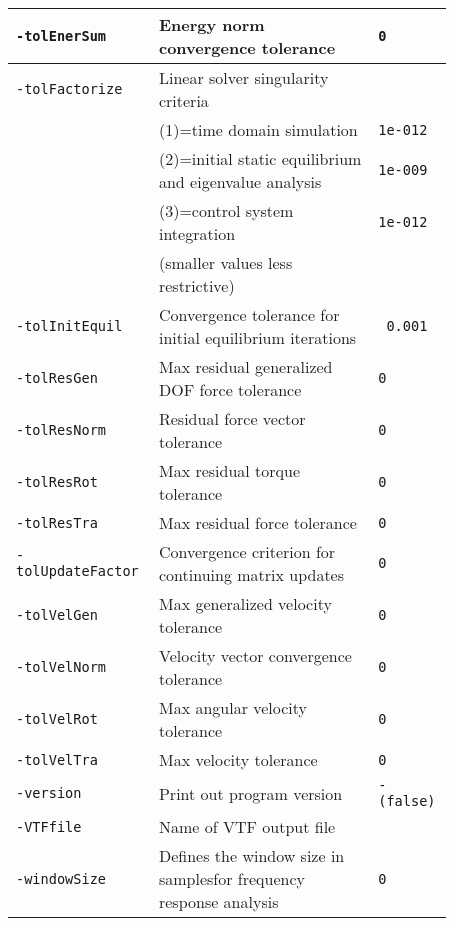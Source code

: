 \begin{threeparttable}[b]
\begin{tabular}{|>{\raggedright} p{0.23\linewidth}| p{0.48\linewidth}| p{0.16\linewidth}|}
  \hline
  \texttt{-tolEnerSum}  &     Energy norm convergence tolerance   & \texttt{0\tnote{1}}  \\
  \hline
  \texttt{-tolFactorize}  &     Linear solver singularity criteria & \\
                          &     (1)=time domain simulation         &      \texttt{1e-012} \\
                          &     (2)=initial static equilibrium and eigenvalue analysis  & \texttt{1e-009} \\
                          &     (3)=control system integration  & \texttt{1e-012} \\
                          &     (smaller values less restrictive)   & \\
  \hline
  \texttt{-tolInitEquil}  &     Convergence tolerance for initial equilibrium iterations  & \texttt{  0.001}  \\
  \hline
  \texttt{-tolResGen}  &     Max residual generalized DOF force tolerance  & \texttt{0\tnote{1}}  \\
  \hline
  \texttt{-tolResNorm}  &     Residual force vector tolerance  & \texttt{0\tnote{1}}  \\
  \hline
  \texttt{-tolResRot}  &     Max residual torque tolerance  & \texttt{0\tnote{1}}  \\
  \hline
  \texttt{-tolResTra}  &     Max residual force tolerance  & \texttt{0\tnote{1}}  \\
  \hline
  \texttt{-tolUpdateFactor}  &     Convergence criterion for continuing matrix updates  & \texttt{0\tnote{1}}  \\
  \hline
  \texttt{-tolVelGen}  &     Max generalized velocity tolerance  & \texttt{0\tnote{1}}  \\
  \hline
  \texttt{-tolVelNorm}  &     Velocity vector convergence tolerance   & \texttt{0\tnote{1}}  \\
  \hline
  \texttt{-tolVelRot}  &     Max angular velocity tolerance  & \texttt{0\tnote{1}}  \\
  \hline
  \texttt{-tolVelTra}  &     Max velocity tolerance   & \texttt{0\tnote{1}}  \\
  \hline
  \texttt{-version}  &     Print out program version  & \texttt{- (false)}  \\
  \hline
  \texttt{-VTFfile}  &     Name of VTF output file & \\
  \hline
  \texttt{-windowSize}  &    Defines the window size in samplesfor frequency response analysis  &  \texttt{0}   \\

\end{tabular}
\end{threeparttable}
